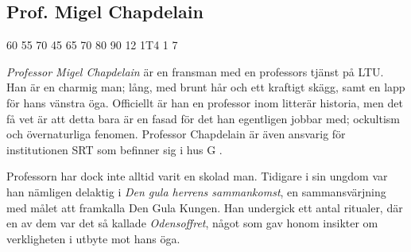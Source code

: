 \subsection{Prof. Migel Chapdelain}
\label{kar:MigelChapdelain}
\character
{60}	%
{55}	%
{70}	%
{45}	%
{65}	%
{70}	%
{80}	%
{90}	%
{12}	%
{1T4}	%
{1}		%
{7}		%
%
{
}
%
{
\textit{Professor Migel Chapdelain} är en fransman med en professors tjänst på LTU. Han är en charmig man; lång, med brunt hår och ett kraftigt skägg, samt en lapp för hans vänstra öga. Officiellt är han en professor inom litterär historia, men det få vet är att detta bara är en fasad för det han egentligen jobbar med; ockultism och övernaturliga fenomen. Professor Chapdelain är även ansvarig för institutionen SRT som befinner sig i hus G \sectiondescribe{\ref{loc:SRT}}.

Professorn har dock inte alltid varit en skolad man. Tidigare i sin ungdom var han nämligen delaktig i \textit{Den gula herrens sammankomst}, en sammansvärjning med målet att framkalla Den Gula Kungen. Han undergick ett antal ritualer, där en av dem var det så kallade \textit{Odensoffret}, något som gav honom insikter om verkligheten i utbyte mot hans öga.
}

